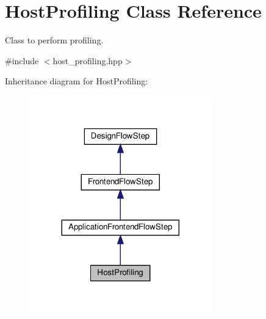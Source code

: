 \hypertarget{classHostProfiling}{}\section{Host\+Profiling Class Reference}
\label{classHostProfiling}


Class to perform profiling.  




{\ttfamily \#include $<$host\+\_\+profiling.\+hpp$>$}



Inheritance diagram for Host\+Profiling\+:
\nopagebreak
\begin{figure}[H]
\begin{center}
\leavevmode
\includegraphics[width=224pt]{db/d43/classHostProfiling__inherit__graph}
\end{center}
\end{figure}


